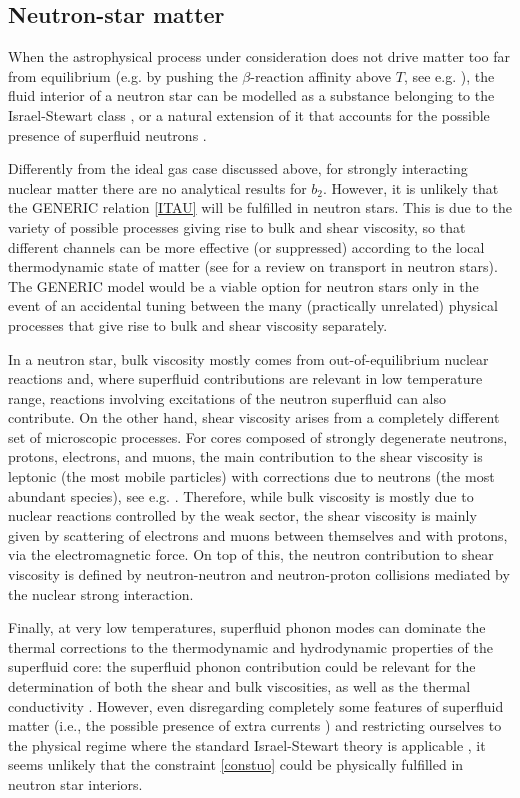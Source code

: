 \documentclass[a4paper, amsfonts, amssymb, amsmath, reprint, showkeys, nofootinbib, twoside, onecolumn, notitlepage]{revtex4-1}
\theoremstyle{definition}
\theoremstyle{theorem}
\begin{document}
\subsection{Neutron-star matter}

When the astrophysical process under consideration does not drive matter too far from equilibrium (e.g. by pushing the $\beta$-reaction affinity above $T$, see e.g. \citep{Schmitt2018ASSL}), the fluid interior of a neutron star can be modelled as a substance belonging to the Israel-Stewart class \citep{Camelio2022,CamelioSecondo2022}, or a natural extension of it that accounts for the possible presence of superfluid neutrons \citep{GavassinoKhalatnikov2022}.

Differently from the ideal gas case discussed above, for strongly interacting nuclear matter there are no analytical results for $b_2$. However, it is unlikely that the GENERIC relation \eqref{ITAU} will be fulfilled in neutron stars. This is due to the variety of possible processes giving rise to bulk and shear viscosity, so that different channels can be more effective (or suppressed) according to the local thermodynamic state of matter (see \citep{Schmitt2018ASSL} for a review on transport in neutron stars). The GENERIC model would be a viable option for neutron stars only in the event of an accidental tuning between the many (practically unrelated) physical processes that give rise to bulk and shear viscosity separately. 

In a neutron star, bulk viscosity mostly comes from out-of-equilibrium nuclear reactions  and, where superfluid contributions are relevant in low temperature range, reactions involving excitations of the neutron superfluid can also contribute. On the other hand, shear viscosity arises from a completely different set of microscopic processes.
For cores composed of strongly degenerate neutrons, protons, electrons, and muons, the main contribution to the shear viscosity is leptonic (the most mobile particles) with corrections due to neutrons (the most abundant species),  see e.g. \citep{Shternin_core_08}. 
Therefore, while bulk viscosity is mostly due to nuclear reactions controlled by the weak sector, the shear viscosity is mainly given by scattering of electrons and muons between themselves and with protons, via the electromagnetic force. 
On top of this, the neutron contribution to shear viscosity is defined by neutron-neutron and neutron-proton collisions mediated by the nuclear strong interaction. 

Finally, at very low temperatures, superfluid phonon modes can dominate the thermal corrections to the thermodynamic and hydrodynamic properties of the superfluid core: the superfluid phonon contribution could be relevant for the determination of both the shear and bulk viscosities, as well as the thermal conductivity \citep{EscobedoManuel2009,Manuel2021Univ}.
However, even disregarding completely some features of superfluid matter (i.e., the possible presence of extra currents \citep{Termo,GavassinoKhalatnikov2022}) and restricting ourselves to the physical regime where the standard Israel-Stewart theory is applicable \citep{BulkGavassino,Camelio2022}, it seems unlikely that the constraint \eqref{constuo} could be physically fulfilled in neutron star interiors. 
\end{document}
